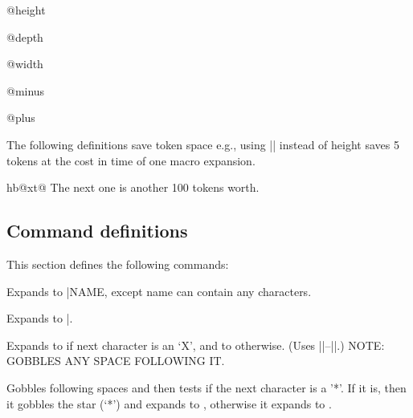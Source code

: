 \begin{docCommand}{@height} { }
\end{docCommand}

\begin{docCommand}{@depth} { }
\end{docCommand}

\begin{docCommand}{@width} { }
\end{docCommand}

\begin{docCommand}{@minus} { }
\end{docCommand}

\begin{docCommand}{@plus} { }
\end{docCommand}



The following definitions save token space  e.g., using
|\@height| instead of height saves 5 tokens at the cost in time
of one macro expansion.
    
\begin{teX}
\def\@height{height} \def\@depth{depth} \def\@width{width}
\def\@minus{minus}
\def\@plus{plus}
\end{teX}
\begin{docCommand}{hb@xt@} { }
The next one is another 100 tokens worth.
\end{docCommand}
\begin{teX}
\def\hb@xt@{\hbox to}
\end{teX}

\begin{teX}
\end{teX}

 \subsection{Command definitions}



 This section defines the following commands:

\begin{docCommands} 
  Expands to |\def\|\marg{NAME},
   except name can contain any characters.

 
   Expands to |\|.


 
Expands to  if next character is an `X',
          and to  otherwise.
          (Uses |\reserved@a|--|\reserved@c|.)
          NOTE: GOBBLES ANY SPACE FOLLOWING IT.
    

  Gobbles following spaces and then tests if the next
 character is a '*'.  If it is, then it gobbles the
 star  (`*') and expands to , otherwise it expands to .


\end{docCommands}

